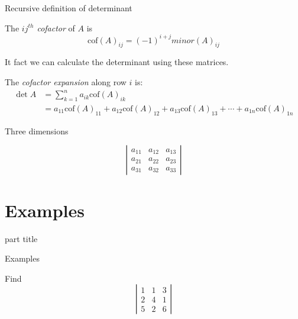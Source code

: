 \documentclass{beamer}
\begin{document}
\begin{frame}{Recursive definition of determinant}
  \begin{definition}
    The \emph{$ij^{th}$ cofactor} of $A$ is
    \begin{equation*}
      \mbox{cof}(A)_{ij}=(-1)^{i+j} minor \left(A\right)_{ij}
    \end{equation*}
  \end{definition}
  It fact we can calculate the determinant using these matrices.
  \begin{definition}
    The \emph{cofactor expansion} along row $i$ is:
    \begin{align*}
      \det A &= \sum_{k=1}^n a_{ik}\mbox{cof}(A)_{ik}\\
             &=a_{11} \mbox{cof}(A)_{11} + a_{12}\mbox{cof}(A)_{12} +
      a_{13}\mbox{cof}(A)_{13} + \cdots + a_{1n}\mbox{cof}(A)_{1n}
    \end{align*}
  \end{definition}
\end{frame}

\begin{frame}{Three dimensions}
  \begin{example}
    \begin{equation*}
      \left|
        \begin{array}{ccc}
          a_{11}&a_{12}&a_{13}\\
          a_{21}&a_{22}&a_{23}\\
          a_{31}&a_{32}&a_{33}
        \end{array}
      \right|
    \end{equation*}
  \end{example}
\end{frame}

\section{Examples}

\begin{frame}
  \begin{beamercolorbox}[sep=12pt,center]{part title}
    \insertsection\par
  \end{beamercolorbox}
\end{frame}

\begin{frame}{Examples}
  
  \begin{example}
    Find
    \begin{equation*}
      \left|
	\begin{array}{ccc}
          1&1&3\\
          2&4&1\\
          5&2&6
	\end{array}
      \right|
    \end{equation*}
  \end{example}
\end{frame}
\end{document}
